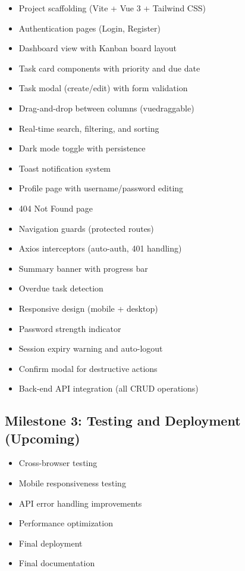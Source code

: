 \documentclass[12pt, a4paper]{article}
\newcommand{\cmark}{\textcolor{greencheck}{\ding{51}}}
\begin{document}
\begin{itemize}[nosep]
    \item[\cmark] Project scaffolding (Vite + Vue 3 + Tailwind CSS)
    \item[\cmark] Authentication pages (Login, Register)
    \item[\cmark] Dashboard view with Kanban board layout
    \item[\cmark] Task card components with priority and due date
    \item[\cmark] Task modal (create/edit) with form validation
    \item[\cmark] Drag-and-drop between columns (vuedraggable)
    \item[\cmark] Real-time search, filtering, and sorting
    \item[\cmark] Dark mode toggle with persistence
    \item[\cmark] Toast notification system
    \item[\cmark] Profile page with username/password editing
    \item[\cmark] 404 Not Found page
    \item[\cmark] Navigation guards (protected routes)
    \item[\cmark] Axios interceptors (auto-auth, 401 handling)
    \item[\cmark] Summary banner with progress bar
    \item[\cmark] Overdue task detection
    \item[\cmark] Responsive design (mobile + desktop)
    \item[\cmark] Password strength indicator
    \item[\cmark] Session expiry warning and auto-logout
    \item[\cmark] Confirm modal for destructive actions
    \item[\cmark] Back-end API integration (all CRUD operations)
\end{itemize}

\subsection{Milestone 3: Testing and Deployment (Upcoming)}

\begin{itemize}[nosep]
    \item[$\square$] Cross-browser testing
    \item[$\square$] Mobile responsiveness testing
    \item[$\square$] API error handling improvements
    \item[$\square$] Performance optimization
    \item[$\square$] Final deployment
    \item[$\square$] Final documentation
\end{itemize}
\end{document}
